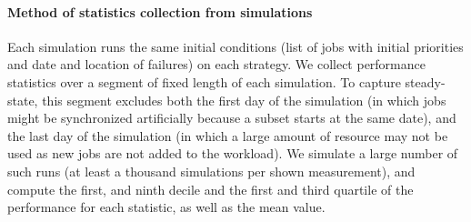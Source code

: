 \paragraph*{Method of statistics collection from simulations}
Each simulation runs the same initial conditions (list of jobs with
initial priorities and date and location of failures) on each
strategy.
We collect performance statistics over a segment of fixed length of
each simulation.
To capture steady-state, this segment excludes both the first day of
the simulation (in which jobs might be synchronized artificially
because a subset starts at the same date), and the last day of the
simulation (in which a large amount of resource may not be used as new
jobs are not added to the workload). We simulate a large number of
such runs (at least a thousand simulations per shown measurement), and
compute the first, and ninth decile and the first and third quartile
of the performance for each statistic, as well as the mean value.
